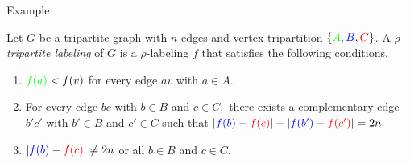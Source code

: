 \documentclass[11pt,serif,professionalfont,aspectratio=169]{beamer}
\newcommand{\vertex}{\node[vertex]}
\theoremstyle{plain}
\begin{document}
\begin{frame}{Example}
    
Let $G$ be a tripartite graph with $n$ edges and vertex tripartition $\{\textcolor{green}{A},\textcolor{blue}{B},\textcolor{red}{C}\}$. A $\rho$-\emph{tripartite labeling} of $G$ is a $\rho$-labeling $f$ that satisfies the following conditions.
\begin{enumerate}
\item $\textcolor{green}{f(a)}<f(v)$ for every edge $av$ with $a \in A.$
\item For every edge $bc$ with $b \in B$ and $c \in C,$ there exists a complementary edge $b'c'$ with $b' \in B$ and $c' \in C$ such that 
$ |\textcolor{blue}{f(b)}-\textcolor{red}{f(c)}|+|\textcolor{blue}{f(b')}-\textcolor{red}{f(c')}|=2n.$
\item $|\textcolor{blue}{f(b)}-\textcolor{red}{f(c)}| \neq 2n$ or all $b \in B$ and $c \in C$.
\end{enumerate}
\begin{center}
\end{center}
\end{frame}
\end{document}
